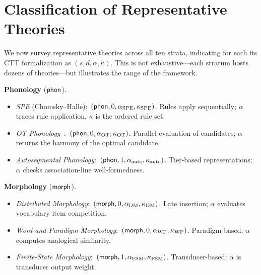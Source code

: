 \section{Classification of Representative Theories}
\label{sec:classification}

We now survey representative theories across all ten strata,
indicating for each its CTT formalization as
$(s, d, \alpha, \kappa)$.  This is not exhaustive---each stratum
hosts dozens of theories---but illustrates the range of the framework.

\medskip

\noindent\textbf{Phonology} ($\mathsf{phon}$).
\begin{itemize}[nosep]
\item \emph{SPE} (Chomsky--Halle):\ $({\mathsf{phon}}, 0, \alpha_{\mathrm{SPE}}, \kappa_{\mathrm{SPE}})$.
  Rules apply sequentially; $\alpha$ traces rule application,
  $\kappa$ is the ordered rule set.
\item \emph{OT Phonology}~\cite{prince1993}:\ $({\mathsf{phon}}, 0,
  \alpha_{\mathrm{OT}}, \kappa_{\mathrm{OT}})$.
  Parallel evaluation of candidates; $\alpha$ returns the harmony
  of the optimal candidate.
\item \emph{Autosegmental Phonology}:\ $({\mathsf{phon}}, 1,
  \alpha_{\mathrm{auto}}, \kappa_{\mathrm{auto}})$.
  Tier-based representations; $\alpha$ checks association-line
  well-formedness.
\end{itemize}

\noindent\textbf{Morphology} ($\mathsf{morph}$).
\begin{itemize}[nosep]
\item \emph{Distributed Morphology}:\ $({\mathsf{morph}}, 0,
  \alpha_{\mathrm{DM}}, \kappa_{\mathrm{DM}})$.
  Late insertion; $\alpha$ evaluates vocabulary item competition.
\item \emph{Word-and-Paradigm Morphology}:\ $({\mathsf{morph}}, 0,
  \alpha_{\mathrm{WP}}, \kappa_{\mathrm{WP}})$.
  Paradigm-based; $\alpha$ computes analogical similarity.
\item \emph{Finite-State Morphology}:\ $({\mathsf{morph}}, 1,
  \alpha_{\mathrm{FSM}}, \kappa_{\mathrm{FSM}})$.
  Transducer-based; $\alpha$ is transducer output weight.
\end{itemize}

